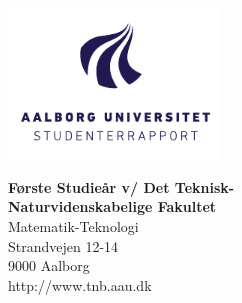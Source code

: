 

{}
\thispagestyle{empty}

\begin{minipage}[t]{0.48\textwidth}
\vspace*{-25pt}			%
\includegraphics[height=4cm]{billeder/AAU-logo-stud-DK-RGB}
\end{minipage}
\hfill
\begin{minipage}[t]{0.48\textwidth}
{\small 
\textbf{Første Studieår v/ Det Teknisk-}\\
\textbf{Naturvidenskabelige Fakultet}  \\
Matematik-Teknologi \\
Strandvejen 12-14 \\
9000 Aalborg \\
http://www.tnb.aau.dk}
\end{minipage}

\vspace*{1cm}

